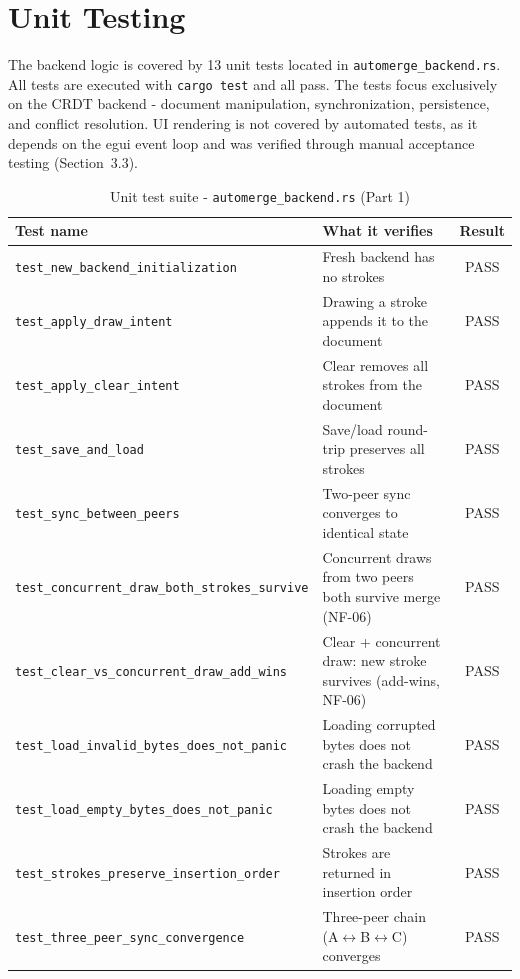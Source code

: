 \documentclass[a4paper,11pt,twoside]{report}
\theoremstyle{definition}
\begin{document}
\section{Unit Testing}

The backend logic is covered by 13 unit tests located in \texttt{automerge\_backend.rs}.
All tests are executed with \texttt{cargo test} and all pass. The tests focus exclusively on
the CRDT backend - document manipulation, synchronization, persistence, and conflict
resolution. UI rendering is not covered by automated tests, as it depends on the egui
event loop and was verified through manual acceptance testing (Section~3.3).

\begin{table}[H]
    \centering
    \caption{Unit test suite - \texttt{automerge\_backend.rs} (Part 1)}
    \begin{tabular}{|p{}|p{}|c|}
        \hline
        \textbf{Test name} & \textbf{What it verifies} & \textbf{Result} \\
        \hline
        \texttt{test\_new\_backend\_initialization} & Fresh backend has no strokes & PASS \\
        \hline
        \texttt{test\_apply\_draw\_intent} & Drawing a stroke appends it to the document & PASS \\
        \hline
        \texttt{test\_apply\_clear\_intent} & Clear removes all strokes from the document & PASS \\
        \hline
        \texttt{test\_save\_and\_load} & Save/load round-trip preserves all strokes & PASS \\
        \hline
        \texttt{test\_sync\_between\_peers} & Two-peer sync converges to identical state & PASS \\
        \hline
        \texttt{test\_concurrent\_draw\_both\_strokes\_survive} & Concurrent draws from two peers both survive merge (NF-06) & PASS \\
        \hline
        \texttt{test\_clear\_vs\_concurrent\_draw\_add\_wins} & Clear + concurrent draw: new stroke survives (add-wins, NF-06) & PASS \\
        \hline
         \texttt{test\_load\_invalid\_bytes\_does\_not\_panic} & Loading corrupted bytes does not crash the backend & PASS \\
        \hline
        \texttt{test\_load\_empty\_bytes\_does\_not\_panic} & Loading empty bytes does not crash the backend & PASS \\
        \hline
         \texttt{test\_strokes\_preserve\_insertion\_order} & Strokes are returned in insertion order & PASS \\
        \hline
           \texttt{test\_three\_peer\_sync\_convergence} & Three-peer chain (A$\leftrightarrow$B$\leftrightarrow$C) converges & PASS \\
        \hline
    \end{tabular}
    \label{tab:unit-tests-1}
\end{table}
\end{document}
